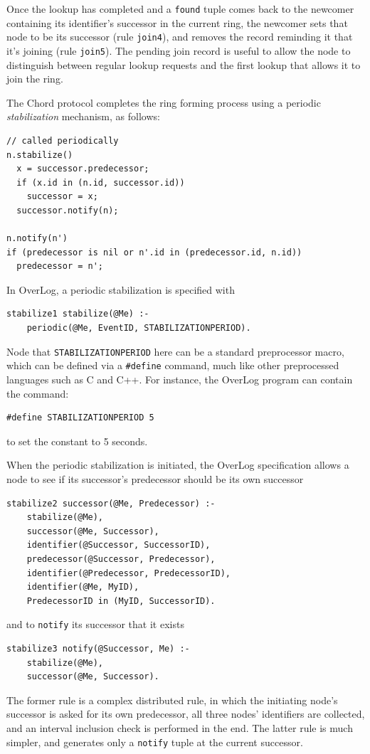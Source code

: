\documentclass{article}
\begin{document}
Once the lookup has completed and a \lstinline$found$ tuple comes back
to the newcomer containing its identifier's successor in the current
ring, the newcomer sets that node to be its successor (rule
\lstinline$join4$), and removes the record reminding it that it's
joining (rule \lstinline$join5$).  The pending join record is useful to
allow the node to distinguish between regular lookup requests and the
first lookup that allows it to join the ring.

The Chord protocol completes the ring forming process using a
periodic \emph{stabilization} mechanism, as follows:
\begin{verbatim}
// called periodically
n.stabilize()
  x = successor.predecessor;
  if (x.id in (n.id, successor.id))
    successor = x;
  successor.notify(n);

n.notify(n')
if (predecessor is nil or n'.id in (predecessor.id, n.id))
  predecessor = n';
\end{verbatim}
In OverLog, a periodic stabilization is specified with
\begin{lstlisting}
stabilize1 stabilize(@Me) :-
	periodic(@Me, EventID, STABILIZATIONPERIOD).
\end{lstlisting}
Node that \texttt{STABILIZATIONPERIOD} here can be a standard
preprocessor macro, which can be defined via a \texttt{\#define} command, much
like other preprocessed languages such as C and C++. For instance, the
OverLog program can contain the command:
\begin{lstlisting}
#define STABILIZATIONPERIOD 5
\end{lstlisting}
to set the constant to 5 seconds.

When the periodic stabilization is initiated, the OverLog specification
allows a node to see if its successor's predecessor should be its own
successor
\begin{lstlisting}
stabilize2 successor(@Me, Predecessor) :-
	stabilize(@Me),
	successor(@Me, Successor),
	identifier(@Successor, SuccessorID),
	predecessor(@Successor, Predecessor),
	identifier(@Predecessor, PredecessorID),
	identifier(@Me, MyID),
	PredecessorID in (MyID, SuccessorID).
\end{lstlisting}
and to \texttt{notify} its successor that it exists
\begin{lstlisting}
stabilize3 notify(@Successor, Me) :-
	stabilize(@Me),
	successor(@Me, Successor).
\end{lstlisting}
The former rule is a complex distributed rule, in which the initiating
node's successor is asked for its own predecessor, all three nodes'
identifiers are collected, and an interval inclusion check is performed
in the end.  The latter rule is much simpler, and generates only a
\lstinline$notify$ tuple at the current successor.
\end{document}
